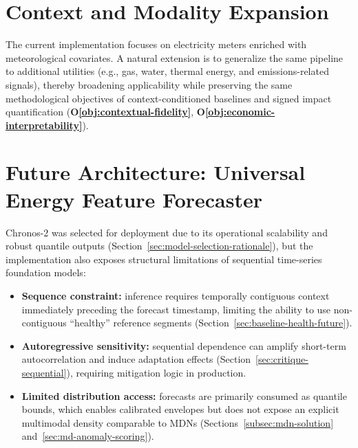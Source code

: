 \section{Context and Modality Expansion}

The current implementation focuses on electricity meters enriched with meteorological
covariates. A natural extension is to generalize the same pipeline to additional
utilities (e.g., gas, water, thermal energy, and emissions-related signals), thereby
broadening applicability while preserving the same methodological objectives of
context-conditioned baselines and signed impact quantification
(\textbf{O\ref{obj:contextual-fidelity}}, \textbf{O\ref{obj:economic-interpretability}}).

\section{Future Architecture: Universal Energy Feature Forecaster}
\label{sec:universal-feature-forecaster}

Chronos-2 was selected for deployment due to its operational scalability and robust
quantile outputs (Section~\ref{sec:model-selection-rationale}), but the implementation
also exposes structural limitations of sequential time-series foundation models:

\begin{itemize}
    \item \textbf{Sequence constraint:} inference requires temporally contiguous
    context immediately preceding the forecast timestamp, limiting the ability to use
    non-contiguous ``healthy'' reference segments (Section~\ref{sec:baseline-health-future}).

    \item \textbf{Autoregressive sensitivity:} sequential dependence can amplify
    short-term autocorrelation and induce adaptation effects (Section~\ref{sec:critique-sequential}),
    requiring mitigation logic in production.

    \item \textbf{Limited distribution access:} forecasts are primarily consumed as
    quantile bounds, which enables calibrated envelopes but does not expose an
    explicit multimodal density comparable to \acp{MDN} (Sections~\ref{subsec:mdn-solution}
    and~\ref{sec:md-anomaly-scoring}).
\end{itemize}

